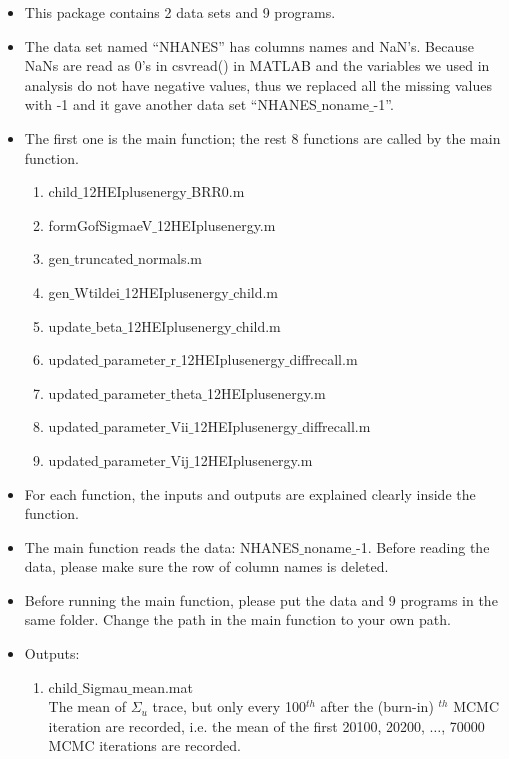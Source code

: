 \documentclass[12pt]{article}
\def\th{^{th}}
\begin{document}
\begin{itemize}
\item This package contains 2 data sets and 9 programs.

\item The data set named ``NHANES'' has columns names and NaN's. Because NaNs are read as 0's in csvread() in MATLAB and the variables we used in analysis do not have negative values, thus we replaced all the missing values with -1 and it gave another data set ``NHANES$\_$noname$\_$-1''.

\item The first one is the main function; the rest 8 functions are called by the main function. 

\begin{enumerate}
\item child$\_$12HEIplusenergy$\_$BRR0.m
\item	formGofSigmaeV$\_$12HEIplusenergy.m
\item gen$\_$truncated$\_$normals.m
\item gen$\_$Wtildei$\_$12HEIplusenergy$\_$child.m
\item	update$\_$beta$\_$12HEIplusenergy$\_$child.m
\item updated$\_$parameter$\_$r$\_$12HEIplusenergy$\_$diffrecall.m
\item	updated$\_$parameter$\_$theta$\_$12HEIplusenergy.m
\item	updated$\_$parameter$\_$Vii$\_$12HEIplusenergy$\_$diffrecall.m
\item updated$\_$parameter$\_$Vij$\_$12HEIplusenergy.m
\end{enumerate}

\item	For each function, the inputs and outputs are explained clearly inside the function. 

\item	The main function reads the data: NHANES$\_$noname$\_$-1. Before reading the data, please make sure the row of column names is deleted.

\item Before running the main function, please put the data and 9 programs in the same folder.  Change the path in the main function to your own path. 

\item Outputs:

\begin{enumerate}
\item	child$\_$Sigmau$\_$mean.mat \\
The mean of $\Sigma_u$ trace, but only every 100$\th$ after the (burn-in) $\th$ MCMC iteration are recorded, i.e. the mean of the first 20100, 20200, $\ldots$, 70000 MCMC iterations are recorded. 


\end{enumerate}
\end{itemize}
\end{document}
